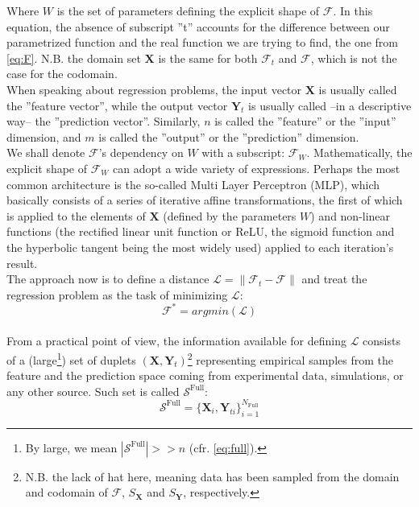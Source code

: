 Where $W$ is the set of parameters defining the explicit shape of $\mathcal{{F}}$. In this equation, the absence of subscript ''t'' accounts for the difference between our parametrized function and the real function we are trying to find, the one from \cref{eq:F}. N.B. the domain set $\mathbf{X}$ is the same for both $\mathcal{F}_t$ and $\mathcal{F}$, which is not the case for the codomain.\\
%
\indent When speaking about regression problems, the input vector $\mathbf{X}$ is usually called the ''feature vector'', while the output vector $\mathbf{Y}_t$ is usually called --in a descriptive way-- the ''prediction vector''. Similarly, $n$ is called the ''feature'' or the ''input'' dimension, and $m$ is called the ''output'' or the ''prediction'' dimension.\\
%
\indent We shall denote $\mathcal{{F}}$'s dependency on $W$ with a subscript: $\mathcal{{F}}_W$. Mathematically, the explicit shape of $\mathcal{{F}}_W$ can adopt a wide variety of expressions. Perhaps the most common architecture is the so-called Multi Layer Perceptron (MLP)\cite{Marsland2015Machine}, which basically consists of a series of iterative affine transformations, the first of which is applied to the elements of $\mathbf{X}$ (defined by the parameters $W$) and non-linear functions (the rectified linear unit function or ReLU, the sigmoid function and the hyperbolic tangent being the most widely used) applied to each iteration's result.\\
%
\indent The approach now is to define a distance $\mathcal{L}=\|\mathcal{F}_t-\mathcal{{F}}\|$ and treat the regression problem as the task of minimizing $\mathcal{L}$:
\begin{equation}\label{eq:Fargmin}
	\mathcal{{F}}^*=argmin(\mathcal{L})
\end{equation}\\
%
\indent From a practical point of view, the information available for defining $\mathcal{L}$ consists of a (large\footnote{By large, we mean $\left|\mathcal{S}^\text{Full}\right|>>n$ (cfr. \cref{eq:full}).}) set of duplets $(\mathbf{X},\mathbf{Y}_t)$\footnote{N.B. the lack of hat here, meaning data has been sampled from the domain and codomain of $\mathcal{F}$, $S_\mathbf{X}$ and $S_\mathbf{Y}$, respectively.} representing empirical samples from the feature and the prediction space coming from experimental data, simulations, or any other source. Such set is called $\mathcal{S}^\text{Full}$:
\begin{equation}\label{eq:full}
	\mathcal{S}^\text{Full}=\{\mathbf{X}_i,\mathbf{Y}_{ti}\}_{i=1}^{N_{\text{Full}}}
\end{equation}
